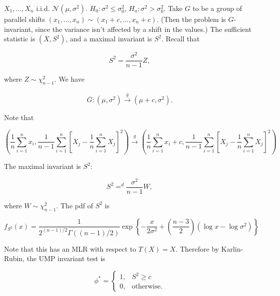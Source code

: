 \begin{example}

\(X_1, \ldots, X_n\) i.i.d. \(\mathcal{N}(\mu, \sigma^2)\). \(H_0: \sigma^2 \leq \sigma_0^2\), \(H_a: \sigma^2 > \sigma_0^2\). Take \(G\) to be a group of parallel shifts \((x_1,\ldots, x_n) \sim (x_1 +c, \ldots, x_n +c)\). (Then the problem is \(G\)-invariant, since the variance isn't affected by a shift in the values.) The sufficient statistic is \((\overline{X}, S^2)\), and a maximal invariant is \(S^2\). Recall that 

\[
S^2 = \frac{\sigma^2}{n-1} Z,
\]

where \(Z \sim \chi_{n-1}^2\). We have

\[
\overline{G}: (\mu, \sigma^2) \xrightarrow{\overline{g}} (\mu+c, \sigma^2).
\]

Note that 

\[
\left( \frac{1}{n} \sum_{i=1}^n x_i, \frac{1}{n-1} \sum_{i=1}^n \left[ X_j - \frac{1}{n} \sum_{i=1}^n X_j \right]^2 \right) \xrightarrow{g} 
\left( \frac{1}{n} \sum_{i=1}^n x_i + c, \frac{1}{n-1} \sum_{i=1}^n \left[ X_j - \frac{1}{n} \sum_{i=1}^n X_j \right]^2 \right) 
\]

The maximal invariant is \(S^2\):

\[
S^2 =^d \frac{\sigma^2}{n-1} W,
\]

where \(W \sim \chi_{n-1}^2\). The pdf of \(S^2\) is 

\[
f_{S^2}(x) = \frac{1}{2^{(n-1)/2} \Gamma((n-1)/2)} \exp \left\{  - \frac{x}{2 \sigma^2} + \left( \frac{n-3}{2}  \right)(\log x - \log \sigma^2) \right\}
\]

Note that this has an MLR with respect to \(T(X) = X\). Therefore by Karlin-Rubin, the UMP invariant test is 

\[
\phi^* = \begin{cases}
1, & S^2 \geq c \\
0, & \text{otherwise}.
\end{cases}
\]

\end{example}

